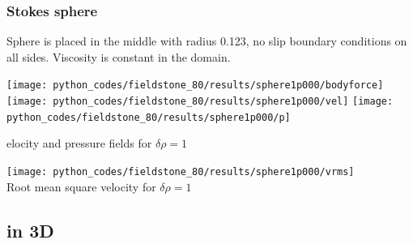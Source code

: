 \subsubsection*{Stokes sphere}

Sphere is placed in the middle with radius 0.123, no slip boundary conditions on all sides. 
Viscosity is constant in the domain.

\begin{center}
\texttt{[image: python\_codes/fieldstone\_80/results/sphere1p000/bodyforce]}
\texttt{[image: python\_codes/fieldstone\_80/results/sphere1p000/vel]}
\texttt{[image: python\_codes/fieldstone\_80/results/sphere1p000/p]}\\
{\caption velocity and pressure fields for $\delta \rho=1$}
\end{center}

\begin{center}
\texttt{[image: python\_codes/fieldstone\_80/results/sphere1p000/vrms]}\\
{\captionfont Root mean square velocity for $\delta \rho=1$}
\end{center}










\subsection*{in 3D}


